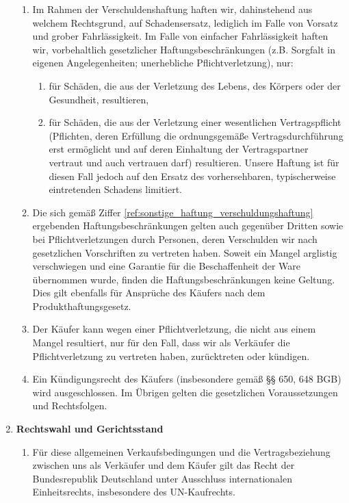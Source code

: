 \documentclass[%
    a4paper,%
    10pt,
]{scrartcl}
\begin{document}
\begin{multicols}{2}
\begin{enumerate}
\begin{enumerate}
            \item \label{ref:sonstige_haftung_verschuldungshaftung}Im Rahmen der Verschuldenshaftung haften wir, dahinstehend aus welchem Rechtsgrund, auf Schadensersatz, lediglich im Falle von Vorsatz und grober Fahrlässigkeit. Im Falle von einfacher Fahrlässigkeit haften wir, vorbehaltlich gesetzlicher Haftungsbeschränkungen (z.B. Sorgfalt in eigenen Angelegenheiten; unerhebliche Pflichtverletzung), nur:%
              \begin{enumerate}
              \item \label{ref:sonstige_haftung_verkaeufer_schaeden}für Schäden, die aus der Verletzung des Lebens, des Körpers oder der Gesundheit, resultieren,
              \item für Schäden, die aus der Verletzung einer wesentlichen Vertragspflicht (Pflichten, deren Erfüllung die ordnungsgemäße Vertragsdurchführung erst ermöglicht und auf deren Einhaltung der Vertragspartner vertraut und auch vertrauen darf) resultieren. Unsere Haftung ist für diesen Fall jedoch auf den Ersatz des vorhersehbaren, typischerweise eintretenden Schadens limitiert.
              \end{enumerate}
            \vfill\null
            \columnbreak
            \item Die sich gemäß Ziffer \ref{ref:sonstige_haftung_verschuldungshaftung} ergebenden Haftungsbeschränkungen gelten auch gegenüber Dritten sowie bei Pflichtverletzungen durch Personen, deren Verschulden wir nach gesetzlichen Vorschriften zu vertreten haben. Soweit ein Mangel arglistig verschwiegen und eine Garantie für die Beschaffenheit der Ware übernommen wurde, finden die Haftungsbeschränkungen keine Geltung. Dies gilt ebenfalls für Ansprüche des Käufers nach dem Produkthaftungsgesetz.
            \item Der Käufer kann wegen einer Pflichtverletzung, die nicht aus einem Mangel resultiert, nur für den Fall, dass wir als Verkäufer die Pflichtverletzung zu vertreten haben, zurücktreten oder kündigen.
            \item Ein Kündigungsrecht des Käufers (insbesondere gemäß §§ 650, 648 BGB) wird ausgeschlossen. Im Übrigen gelten die gesetzlichen Voraussetzungen und Rechtsfolgen.
            \end{enumerate}
          \item \textbf{Rechtswahl und Gerichtsstand}%
            \begin{enumerate}
              \item Für diese allgemeinen Verkaufsbedingungen und die Vertragsbeziehung zwischen uns als Verkäufer und dem Käufer gilt das Recht der Bundesrepublik Deutschland unter Ausschluss internationalen Einheitsrechts, insbesondere des UN-Kaufrechts.

\end{enumerate}
\end{enumerate}
\end{multicols}
\end{document}
